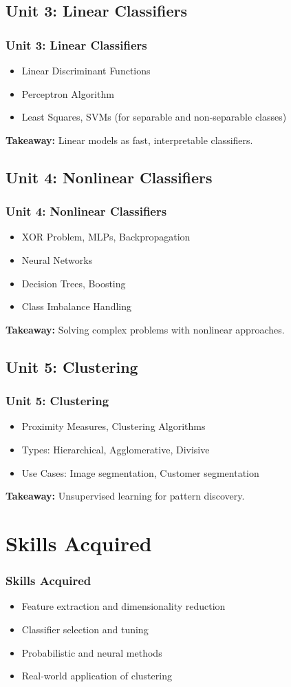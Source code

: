\documentclass{beamer}
\begin{document}
\subsection{Unit 3: Linear Classifiers}
\begin{frame}
\frametitle{Unit 3: Linear Classifiers}
\begin{itemize}
  \item Linear Discriminant Functions
  \item Perceptron Algorithm
  \item Least Squares, SVMs (for separable and non-separable classes)
\end{itemize}
\textbf{Takeaway:} Linear models as fast, interpretable classifiers.
\end{frame}

\subsection{Unit 4: Nonlinear Classifiers}
\begin{frame}
\frametitle{Unit 4: Nonlinear Classifiers}
\begin{itemize}
  \item XOR Problem, MLPs, Backpropagation
  \item Neural Networks
  \item Decision Trees, Boosting
  \item Class Imbalance Handling
\end{itemize}
\textbf{Takeaway:} Solving complex problems with nonlinear approaches.
\end{frame}

\subsection{Unit 5: Clustering}
\begin{frame}
\frametitle{Unit 5: Clustering}
\begin{itemize}
  \item Proximity Measures, Clustering Algorithms
  \item Types: Hierarchical, Agglomerative, Divisive
  \item Use Cases: Image segmentation, Customer segmentation
\end{itemize}
\textbf{Takeaway:} Unsupervised learning for pattern discovery.
\end{frame}

\section{Skills Acquired}
\begin{frame}
\frametitle{Skills Acquired}
\begin{itemize}
  \item Feature extraction and dimensionality reduction
  \item Classifier selection and tuning
  \item Probabilistic and neural methods
  \item Real-world application of clustering
\end{itemize}
\end{frame}
\end{document}
